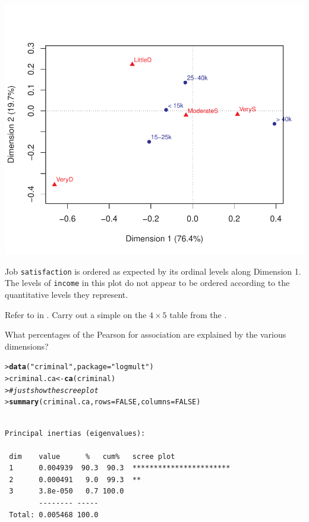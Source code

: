 \documentclass[10pt]{report}\usepackage[]{graphicx}\usepackage[]{color}
\makeatletter
\newcommand{\hlnum}[1]{\textcolor[rgb]{0.686,0.059,0.569}{#1}}%
\newcommand{\hlstr}[1]{\textcolor[rgb]{0.192,0.494,0.8}{#1}}%
\newcommand{\hlcom}[1]{\textcolor[rgb]{0.678,0.584,0.686}{\textit{#1}}}%
\newcommand{\hlstd}[1]{\textcolor[rgb]{0.345,0.345,0.345}{#1}}%
\newcommand{\hlkwb}[1]{\textcolor[rgb]{0.69,0.353,0.396}{#1}}%
\newcommand{\hlkwc}[1]{\textcolor[rgb]{0.333,0.667,0.333}{#1}}%
\newcommand{\hlkwd}[1]{\textcolor[rgb]{0.737,0.353,0.396}{\textbf{#1}}}%
\newenvironment{kframe}{%
 \def\at@end@of@kframe{}%
 \ifinner\ifhmode%
  \def\at@end@of@kframe{\end{minipage}}%
  \begin{minipage}{\columnwidth}%
 \fi\fi%
 \def\FrameCommand##1{\hskip\@totalleftmargin \hskip-\fboxsep
 \colorbox{shadecolor}{##1}\hskip-\fboxsep
     \hskip-\linewidth \hskip-\@totalleftmargin \hskip\columnwidth}%
 \MakeFramed {\advance\hsize-\width
   \@totalleftmargin\z@ \linewidth\hsize
   \@setminipage}}%
 {\par\unskip\endMakeFramed%
 \at@end@of@kframe}
\newenvironment{knitrout}{}{} %
\renewenvironment{knitrout}{\small\renewcommand{\baselinestretch}{.85}}{} %
\makeatother
\begin{document}
\begin{Exercises}
\begin{enumerate*}
\begin{ans}
\begin{knitrout}
\centerline{\includegraphics[width=.5\textwidth]{soln/fig/ex6_1b-1} }



\end{knitrout}
    Job \texttt{satisfaction} is ordered as expected by its ordinal levels along Dimension 1. The levels of \texttt{income}
    in this plot do not appear to be ordered according to the quantitative levels they represent.
    \end{ans}
    
  \end{enumerate*}
  
  \exercise\label{lab:ca-criminal} Refer to  in .  Carry out a simple \ca on the
  $4 \times 5$ table  from the .
  \begin{enumerate*}
    \item What percentages of the Pearson \chisq for association are explained
    by the various dimensions?
    \begin{ans}
\begin{knitrout}\footnotesize
{}\color{fgcolor}\begin{kframe}
\begin{alltt}
\hlstd{> }\hlkwd{data}\hlstd{(}\hlstr{"criminal"}\hlstd{,} \hlkwc{package} \hlstd{=} \hlstr{"logmult"}\hlstd{)}
\hlstd{> }\hlstd{criminal.ca} \hlkwb{<-} \hlkwd{ca}\hlstd{(criminal)}
\hlstd{> }     \hlcom{# just show the scree plot}
\hlstd{> }\hlkwd{summary}\hlstd{(criminal.ca,} \hlkwc{rows}\hlstd{=}\hlnum{FALSE}\hlstd{,} \hlkwc{columns}\hlstd{=}\hlnum{FALSE}\hlstd{)}
\end{alltt}
\begin{verbatim}

Principal inertias (eigenvalues):

 dim    value      %   cum%   scree plot               
 1      0.004939  90.3  90.3  ***********************  
 2      0.000491   9.0  99.3  **                       
 3      3.8e-050   0.7 100.0                           
        -------- -----                                 
 Total: 0.005468 100.0                                 
\end{verbatim}
\end{kframe}
\end{knitrout}
    \end{ans}
    

\end{enumerate*}
\end{Exercises}
\end{document}
